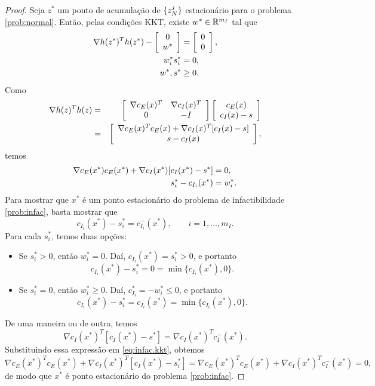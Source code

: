 \begin{proof}
  Seja $z^*$ um ponto de acumulação de $\{z_N^j\}$ estacionário para o problema
  \eqref{prob:normal}. Então, pelas condições KKT, existe $w^*\in\mathbb{R}^{m_I}$ tal que
\begin{align*}
  \nabla h(z^*)^Th(z^*) - \left[\begin{array}{c}0 \\ w^*\end{array}\right] & = \left[\begin{array}{c}0 \\ 0\end{array}\right], \\
  w_i^*s_i^* & = 0, \\
  w^*, s^* & \geq 0.
\end{align*}
Como
\begin{eqnarray*}
  \nabla h(z)^T h(z) & = & \left[\begin{array}{cc}\nabla c_E(x)^T & \nabla
    c_I(x)^T \\ 0 & -I\end{array}\right]\left[\begin{array}{c}c_E(x) \\ c_I(x) - s\end{array}\right] \\
  & = & \left[\begin{array}{c} \nabla c_E(x)^Tc_E(x) + \nabla c_I(x)^T[c_I(x) - s] \\ s - c_I(x)\end{array}\right],
\end{eqnarray*}
temos
\begin{align}
  \nabla c_E(x^*)c_E(x^*) + \nabla c_I(x^*)[c_I(x^*) - s^*] & = 0,
  \visiblelbl{eq:infac.kkt} \\
  s_i^* - c_{I_i}(x^*) & = w_i^*. \nonumber
\end{align}
Para mostrar que $x^*$ é um ponto estacionário do problema de
infactibilidade \eqref{prob:infac}, basta mostrar que 
$$c_{I_i}(x^*) - s_i^* = c_{I_i}^-(x^*), \qquad i = 1,\dots,m_I. $$
Para cada $s_i^*$, temos duas opções:
\begin{itemize}
 \item Se $s_i^* > 0$, então $w_i^* = 0$. Daí, $ c_{I_i}(x^*) = s_i^* > 0$, e
   portanto
   $$c_{I_i}(x^*) - s_i^* = 0 = \min\{ c_{I_i}(x^*), 0\}.$$
 \item Se $s_i^* = 0$, então $w_i^* \geq 0$. Daí, $c_{I_i}^* = -w_i^* \leq 0$, e
   portanto
   $$c_{I_i}(x^*) - s_i^* = c_{I_i}(x^*) = \min\{c_{I_i}(x^*),0\}.$$
\end{itemize}
De uma maneira ou de outra, temos
$$ \nabla c_I(x^*)^T[c_I(x^*) - s^*] = \nabla c_I(x^*)^Tc_I^-(x^*). $$
Substituindo essa expressão em \eqref{eq:infac.kkt}, obtemos
$$ \nabla c_E(x^*)^T c_E(x^*) + \nabla c_I(x^*)^T[c_I(x^*) - s_i^*] =
\nabla c_E(x^*)^T c_E(x^*) + \nabla c_I(x^*)^T c_I^-(x^*) = 0, $$
de modo que $x^*$ é ponto estacionário do problema \eqref{prob:infac}.
\end{proof}
